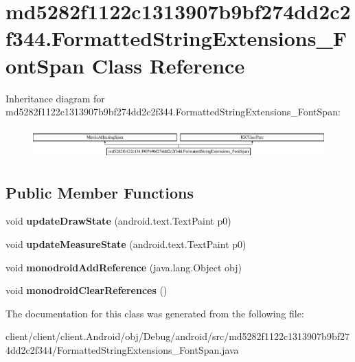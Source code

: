 \hypertarget{classmd5282f1122c1313907b9bf274dd2c2f344_1_1FormattedStringExtensions__FontSpan}{}\section{md5282f1122c1313907b9bf274dd2c2f344.\+Formatted\+String\+Extensions\+\_\+\+Font\+Span Class Reference}
\label{classmd5282f1122c1313907b9bf274dd2c2f344_1_1FormattedStringExtensions__FontSpan}
Inheritance diagram for md5282f1122c1313907b9bf274dd2c2f344.\+Formatted\+String\+Extensions\+\_\+\+Font\+Span\+:\begin{figure}[H]
\begin{center}
\leavevmode
\includegraphics[height=1.186441cm]{classmd5282f1122c1313907b9bf274dd2c2f344_1_1FormattedStringExtensions__FontSpan}
\end{center}
\end{figure}
\subsection*{Public Member Functions}
\begin{DoxyCompactItemize}
\item 
\hypertarget{classmd5282f1122c1313907b9bf274dd2c2f344_1_1FormattedStringExtensions__FontSpan_a91dbd41c771beaeb7e3386ff469907a9}{}void {\bfseries update\+Draw\+State} (android.\+text.\+Text\+Paint p0)\label{classmd5282f1122c1313907b9bf274dd2c2f344_1_1FormattedStringExtensions__FontSpan_a91dbd41c771beaeb7e3386ff469907a9}

\item 
\hypertarget{classmd5282f1122c1313907b9bf274dd2c2f344_1_1FormattedStringExtensions__FontSpan_aca9b0f2eb508a822bf9a9611e76d0907}{}void {\bfseries update\+Measure\+State} (android.\+text.\+Text\+Paint p0)\label{classmd5282f1122c1313907b9bf274dd2c2f344_1_1FormattedStringExtensions__FontSpan_aca9b0f2eb508a822bf9a9611e76d0907}

\item 
\hypertarget{classmd5282f1122c1313907b9bf274dd2c2f344_1_1FormattedStringExtensions__FontSpan_aa01d77622e9fc9a70cb9d3fcf29da754}{}void {\bfseries monodroid\+Add\+Reference} (java.\+lang.\+Object obj)\label{classmd5282f1122c1313907b9bf274dd2c2f344_1_1FormattedStringExtensions__FontSpan_aa01d77622e9fc9a70cb9d3fcf29da754}

\item 
\hypertarget{classmd5282f1122c1313907b9bf274dd2c2f344_1_1FormattedStringExtensions__FontSpan_a6d8093b502a384b0241650912c97fa9e}{}void {\bfseries monodroid\+Clear\+References} ()\label{classmd5282f1122c1313907b9bf274dd2c2f344_1_1FormattedStringExtensions__FontSpan_a6d8093b502a384b0241650912c97fa9e}

\end{DoxyCompactItemize}


The documentation for this class was generated from the following file\+:\begin{DoxyCompactItemize}
\item 
client/client/client.\+Android/obj/\+Debug/android/src/md5282f1122c1313907b9bf274dd2c2f344/Formatted\+String\+Extensions\+\_\+\+Font\+Span.\+java\end{DoxyCompactItemize}
